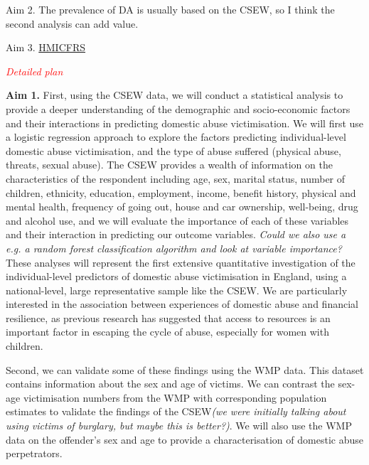 \documentclass[11pt, a4paper]{article}
\begin{document}
Aim 2. The prevalence of DA is usually based on the CSEW, so I think the second analysis can add value.

Aim 3. \href{https://www.justiceinspectorates.gov.uk/hmicfrs/news/news-feed/little-evidence-of-improvements-in-crime-recording-at-west-midlands-police/}{HMICFRS}

\textcolor{red}{\textit{Detailed plan}}

\textbf{Aim 1.} First, using the CSEW data, we will conduct a statistical analysis to provide a deeper understanding of the demographic and socio-economic factors and their interactions in predicting domestic abuse victimisation. We will first use a logistic regression approach to explore the factors predicting individual-level domestic abuse victimisation, and the type of abuse suffered (physical abuse, threats, sexual abuse). The CSEW provides a wealth of information on the characteristics of the respondent including age, sex, marital status, number of children, ethnicity, education, employment, income, benefit history, physical and mental health, frequency of going out, house and car ownership, well-being, drug and alcohol use, and we will evaluate the importance of each of these variables and their interaction in predicting our outcome variables. \textit{Could we also use a e.g. a random forest classification algorithm and look at variable importance?}  These analyses will represent the first extensive quantitative investigation of the individual-level predictors of domestic abuse victimisation in England, using a national-level, large representative sample like the CSEW. We are particularly interested in the association between experiences of domestic abuse and financial resilience, as previous research has suggested that access to resources is an important factor in escaping the cycle of abuse, especially for women with children.

Second, we can validate some of these findings using the WMP data. This dataset contains information about the sex and age of victims. We can contrast the sex-age victimisation numbers from the WMP with corresponding population estimates to validate the findings of the CSEW\textit{(we were initially talking about using victims of burglary, but maybe this is better?)}. We will also use the WMP data on the offender's sex and age to provide a characterisation of domestic abuse perpetrators.

\end{document}
